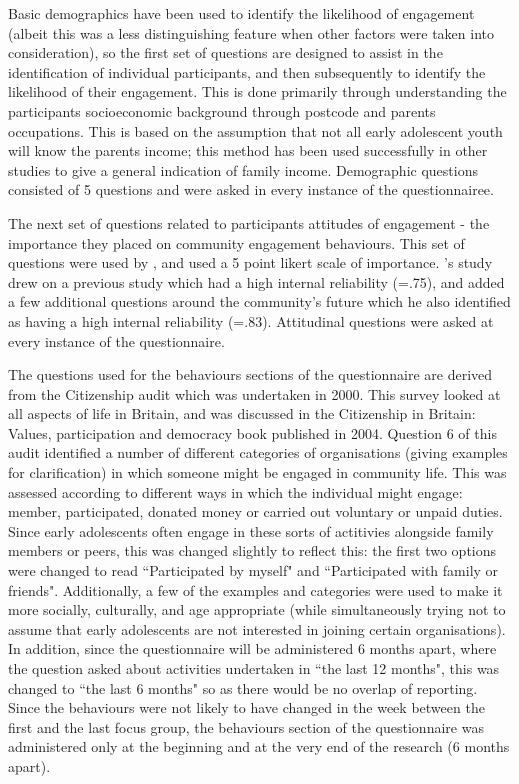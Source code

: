 Basic demographics have been used to identify the likelihood of engagement (albeit this was a less distinguishing feature when other factors were taken into consideration), so the first set of questions are designed to assist in the identification of individual participants, and then subsequently to identify the likelihood of their engagement. This is done primarily through understanding the participants socioeconomic background through postcode and parents occupations. This is based on the assumption that not all early adolescent youth will know the parents income; this method has been used successfully in other studies to give a general indication of family income. Demographic questions consisted of 5 questions and were asked in every instance of the questionnairee. 

The next set of questions related to participants attitudes of engagement - the importance they placed on community engagement behaviours. This set of questions were used by \citet{Lakin2006}, and used a 5 point likert scale of importance. \citeauthor{Lakin2006}'s \citeyearpar{Lakin2006} study drew on a previous study which had a high internal reliability (=.75), and added a few additional questions around the community's future which he also identified as having a high internal reliability (=.83). Attitudinal questions were asked at every instance of the questionnaire. 

The questions used for the behaviours sections of the questionnaire are derived from the Citizenship audit which was undertaken in 2000. This survey looked at all aspects of life in Britain, and was discussed in the Citizenship in Britain: Values, participation and democracy book published in 2004. Question 6 of this audit identified a number of different categories of organisations (giving examples for clarification) in which someone might be engaged in community life. This was assessed according to different ways in which the individual might engage: member, participated, donated money or carried out voluntary or unpaid duties. Since early adolescents often engage in these sorts of actitivies alongside family members or peers, this was changed slightly to reflect this: the first two options were changed to read “Participated by myself" and “Participated with family or friends". Additionally, a few of the examples and categories were used to make it more socially, culturally, and age appropriate (while simultaneously trying not to assume that early adolescents are not interested in joining certain organisations). In addition, since the questionnaire will be administered 6 months apart, where the question asked about activities undertaken in “the last 12 months", this was changed to “the last 6 months" so as there would be no overlap of reporting. Since the behaviours were not likely to have changed in the week between the first and the last focus group, the behaviours section of the questionnaire was administered only at the beginning and at the very end of the research (6 months apart). 

